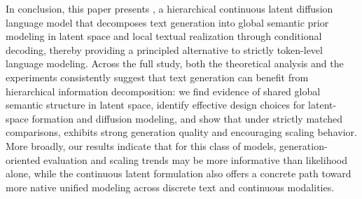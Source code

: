 In conclusion, this paper presents \method, a hierarchical continuous latent diffusion language model that decomposes text generation into global semantic prior modeling in latent space and local textual realization through conditional decoding, thereby providing a principled alternative to strictly token-level language modeling. Across the full study, both the theoretical analysis and the experiments consistently suggest that text generation can benefit from hierarchical information decomposition: we find evidence of shared global semantic structure in latent space, identify effective design choices for latent-space formation and diffusion modeling, and show that under strictly matched comparisons, \method exhibits strong generation quality and encouraging scaling behavior. More broadly, our results indicate that for this class of models, generation-oriented evaluation and scaling trends may be more informative than likelihood alone, while the continuous latent formulation also offers a concrete path toward more native unified modeling across discrete text and continuous modalities.